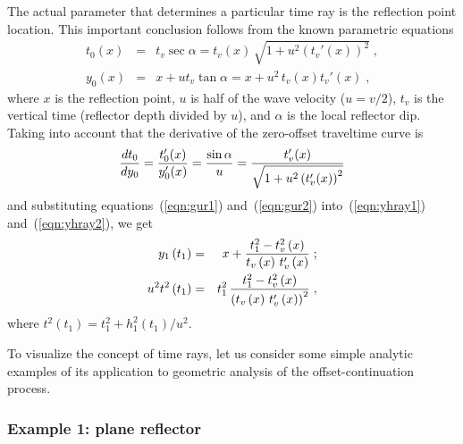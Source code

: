 The actual parameter that
determines a particular time ray is the reflection point location.
This important conclusion follows from the known parametric equations
\begin{eqnarray}
\label{eqn:gur1}
t_0(x) & = & \displaystyle{t_v \sec{\alpha}=
t_v(x)\,\sqrt{1+u^2\left(t_v'(x)\right)^2}}\;, 
\\
y_0(x) & = & \displaystyle{x+u t_v\tan{\alpha} =x+u^2\,t_v(x)t_v'(x)}\;,
\label{eqn:gur2}
\end{eqnarray}
where $x$ is the reflection point, $u$ is half of the wave velocity ($u=v/2$), 
$t_v$ is the vertical time (reflector depth divided by $u$), and
$\alpha$ is the 
local reflector dip. Taking into account that the derivative of the zero-offset
traveltime curve is
\begin{equation}
{{dt_0}\over{dy_0}}={{t_0'(x)}\over{y_0'(x)}}={{\sin{\alpha}}\over u}=
{{t_v'(x)} \over \sqrt{1+u^2\left(t_v'(x)\right)^2}}
\label{eqn:gurtx}
\end{equation}
and substituting equations~(\ref{eqn:gur1}) and~(\ref{eqn:gur2})
into~(\ref{eqn:yhray1}) and~(\ref{eqn:yhray2}), we get
\begin{eqnarray}
\label{eqn:rayrp1}
y_1\left(t_1\right) & = &
\displaystyle{x+{{t_1^2-t_v^2\left(x\right)} \over
{t_v\left(x\right)\,t_v'\left(x\right)}}}\;;
\\
u^2 t^2\left(t_1\right) & = & 
\displaystyle{t_1^2\,{{t_1^2-t_v^2\left(x\right)} \over
{\left(t_v\left(x\right)\,t_v'\left(x\right)\right)^2}}}\;,
\label{eqn:rayrp2}
\end{eqnarray}
where $t^2\left(t_1\right)=t_1^2+h_1^2\left(t_1\right)/u^2$.

To visualize the concept of time rays, let us consider some simple
analytic examples of its application to geometric analysis of the
offset-continuation process.

\subsubsection{Example 1: plane reflector}


